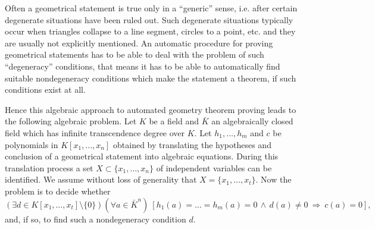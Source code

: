 Often a geometrical statement is true only in a ``generic'' sense, i.e.
after certain degenerate situations have been ruled out. Such degenerate
situations typically occur when triangles collapse to a line segment,
circles to a point, etc. and they are usually not explicitly mentioned.
An automatic procedure for proving geometrical statements has to be able to
deal with the problem of such ``degeneracy'' conditions, that means it has
to be able to automatically find suitable nondegeneracy conditions which
make the statement a theorem, if such conditions exist at all.

Hence this algebraic approach to automated geometry theorem
proving leads to the following algebraic problem.
Let $K$ be
a field and $\bar K$ an algebraically
closed field which has infinite transcendence degree over  $K$.
Let $h_1,\ldots,h_m$ and $c$ be polynomials
in $K[x_1,\ldots,x_n]$ 
obtained by 
translating the hypotheses and conclusion of a geometrical statement
into algebraic equations. 
During this translation process a set $X\subset
\{x_1,\ldots,x_n\}$ of independent variables can be identified. 
We assume 
without loss of generality that 
$X=\{x_1,\ldots,x_t\}$.
Now the problem is to decide whether 
\begin{equation}
(\exists d\in K[x_1,\ldots,x_t]\setminus\{0\})(\forall a\in {\bar K}^n) ~
[h_1(a)=\ldots =h_m(a)=0\,\wedge\, d(a)\not= 0 ~\Rightarrow ~c(a)=0], 
\label{f1}
\end{equation}
and, if so, to find such a nondegeneracy condition $d$.

